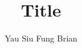 \documentclass[12pt, a4paper]{article}
\title{Title}
\author{Yau Siu Fung Brian}
\date{}
\begin{document}
\maketitle
\onehalfspace
\bigskip


\section{}
\end{document}

